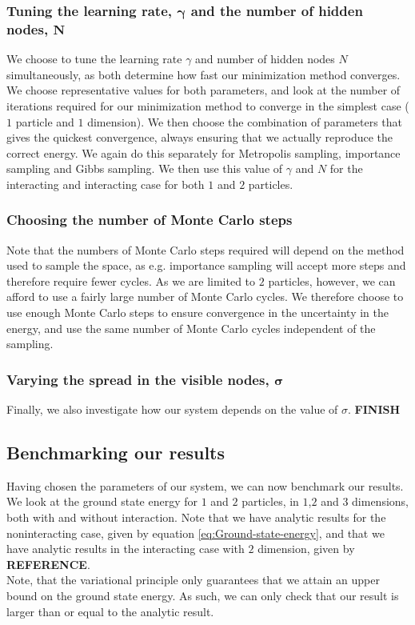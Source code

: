 \documentclass[a4paper, 10pt]{article}
\begin{document}
	\subsubsection{Tuning the learning rate, $\boldsymbol{\gamma}$ and the number of hidden nodes, $\boldsymbol{N}$}
	We choose to tune the learning rate $\gamma$ and number of hidden nodes $N$ simultaneously, as both determine how fast our minimization method converges. We choose representative values for both parameters, and look at the number of iterations required for our minimization method to converge in the simplest case ($1$ particle and $1$ dimension). We then choose the combination of parameters that gives the quickest convergence, always ensuring that we actually reproduce the correct energy. We again do this separately for Metropolis sampling, importance sampling and Gibbs sampling. We then use this value of $\gamma$ and $N$ for the interacting and interacting case for both $1$ and $2$ particles.
	\subsubsection{Choosing the number of Monte Carlo steps}
	Note that the numbers of Monte Carlo steps required will depend on the method used to sample the space, as e.g. importance sampling will accept more steps and therefore require fewer cycles. As we are limited to $2$ particles, however, we can afford to use a fairly large number of Monte Carlo cycles. We therefore choose to use enough Monte Carlo steps to ensure convergence in the uncertainty in the energy, and use the same number of Monte Carlo cycles independent of the sampling. 
	\subsubsection{Varying the spread in the visible nodes, $\boldsymbol{\sigma}$}
	Finally, we also investigate how our system depends on the value of $\sigma$. \textbf{FINISH}
	\subsection{Benchmarking our results}
	Having chosen the parameters of our system, we can now benchmark our results. We look at the ground state energy for $1$ and $2$ particles, in $1$,$2$ and $3$ dimensions, both with and without interaction. Note that we have analytic results for the noninteracting case, given by equation \ref{eq:Ground-state-energy}, and that we have analytic results in the interacting case with $2$ dimension, given by \textbf{REFERENCE}.\\
	\linebreak
	Note, that the variational principle only guarantees that we attain an upper bound on the ground state energy. As such, we can only check that our result is larger than or equal to the analytic result.
\end{document}
